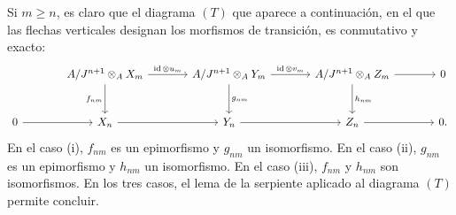 \begin{prooftext}[Demostración]
Si $m\ge n$, es claro que el diagrama $(T)$ que aparece a continuación, en el que las flechas verticales designan los morfismos de transición, es conmutativo y exacto:
\[
\begin{tikzcd}[column sep=large,row sep=large]
{} & A/J^{n+1}\otimes_A X_m \arrow[r,"\id\otimes u_m"] \arrow[d,"f_{nm}"'] & A/J^{n+1}\otimes_A Y_m \arrow[r,"\id\otimes v_m"] \arrow[d,"g_{nm}"] & A/J^{n+1}\otimes_A Z_m \arrow[r] \arrow[d,"h_{nm}"] & 0\\
0 \arrow[r] & X_n \arrow[r] & Y_n \arrow[r] & Z_n \arrow[r] & 0 .
\end{tikzcd}
\]
En el caso (i), $f_{nm}$ es un epimorfismo y $g_{nm}$ un isomorfismo. En el caso (ii), $g_{nm}$ es un epimorfismo y $h_{nm}$ un isomorfismo. En el caso (iii), $f_{nm}$ y $h_{nm}$ son isomorfismos. En los tres casos, el lema de la serpiente aplicado al diagrama $(T)$ permite concluir.
\end{prooftext}
